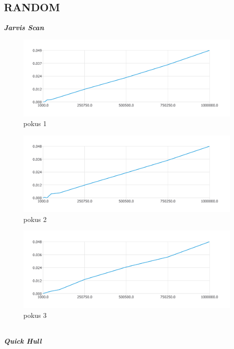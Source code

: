 \documentclass{article}
\begin{document}
\subsection{RANDOM}
\textit{\textbf {Jarvis Scan}}
\\
\begin{figure}[htbp]
\centering
        \includegraphics[clip, trim=0cm 0cm 0cm 0cm, width=1\textwidth]{pdf1.pdf}
        \caption{pokus 1}
\end{figure}
\begin{figure}[htbp]
\centering
        \includegraphics[clip, trim=0cm 0cm 0cm 0cm, width=1\textwidth]{pdf2.pdf}
        \caption{pokus 2}
\end{figure}
\begin{figure}[htbp]
\centering
        \includegraphics[clip, trim=0cm 0cm 0cm 0cm, width=1\textwidth]{pdf3.pdf}
        \caption{pokus 3}
\end{figure}
\\
\clearpage
\newpage
\textit{\textbf {Quick Hull}}
\\
\end{document}
